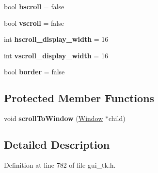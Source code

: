 \begin{DoxyCompactItemize}
\item 
\hypertarget{classGUI_1_1WindowInWindow_a8fe7d1fe8422f6b38887b23aabe5a930}{bool {\bfseries hscroll} = false}\label{classGUI_1_1WindowInWindow_a8fe7d1fe8422f6b38887b23aabe5a930}

\item 
\hypertarget{classGUI_1_1WindowInWindow_a2b5b70f225ba09dc33ca635422414f55}{bool {\bfseries vscroll} = false}\label{classGUI_1_1WindowInWindow_a2b5b70f225ba09dc33ca635422414f55}

\item 
\hypertarget{classGUI_1_1WindowInWindow_a5efdc3a1f8c40a26ba9474a9eec147a2}{int {\bfseries hscroll\-\_\-display\-\_\-width} = 16}\label{classGUI_1_1WindowInWindow_a5efdc3a1f8c40a26ba9474a9eec147a2}

\item 
\hypertarget{classGUI_1_1WindowInWindow_a1f319647b649a31fd64f6a7c7a7ed8e7}{int {\bfseries vscroll\-\_\-display\-\_\-width} = 16}\label{classGUI_1_1WindowInWindow_a1f319647b649a31fd64f6a7c7a7ed8e7}

\item 
\hypertarget{classGUI_1_1WindowInWindow_a02ab75b97521afbbbe7e65c79f5ce47c}{bool {\bfseries border} = false}\label{classGUI_1_1WindowInWindow_a02ab75b97521afbbbe7e65c79f5ce47c}

\end{DoxyCompactItemize}
\subsection*{Protected Member Functions}
\begin{DoxyCompactItemize}
\item 
\hypertarget{classGUI_1_1WindowInWindow_a2c90ec08717161a3cd62de3936bfa11a}{void {\bfseries scroll\-To\-Window} (\hyperlink{classGUI_1_1Window}{Window} $\ast$child)}\label{classGUI_1_1WindowInWindow_a2c90ec08717161a3cd62de3936bfa11a}

\end{DoxyCompactItemize}


\subsection{Detailed Description}


Definition at line 782 of file gui\-\_\-tk.\-h.



